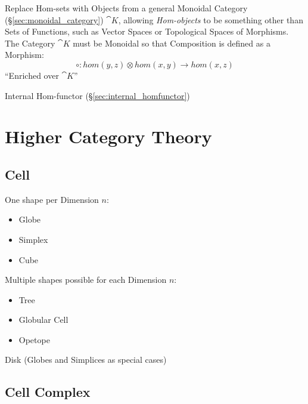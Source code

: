 Replace Hom-sets with Objects from a general Monoidal Category
(\S\ref{sec:monoidal_category}) $\cat{K}$, allowing
\emph{Hom-objects} to be something other than Sets of Functions, such
as Vector Spaces or Topological Spaces of Morphisms. The Category
$\cat{K}$ must be Monoidal so that Composition is defined as a
Morphism:
\[
  \circ : hom(y,z) \otimes hom(x,y) \rightarrow hom(x,z)
\]
``Enriched over $\cat{K}$''

Internal Hom-functor (\S\ref{sec:internal_homfunctor})



\section{Higher Category Theory}\label{sec:higher_category}

\subsection{Cell}\label{sec:cell}

One shape per Dimension $n$:
\begin{itemize}
  \item Globe
  \item Simplex
  \item Cube
\end{itemize}

Multiple shapes possible for each Dimension $n$:
\begin{itemize}
  \item Tree
  \item Globular Cell
  \item Opetope
\end{itemize}

Disk (Globes and Simplices as special cases)



\subsection{Cell Complex}\label{sec:cell_complex}

